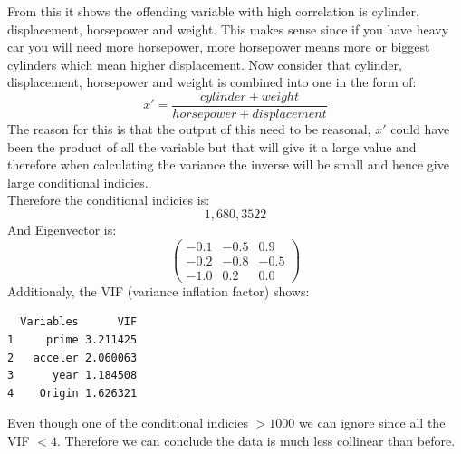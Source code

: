 \documentclass[11pt]{article} %
\begin{document}
From this it shows the offending variable with high correlation is cylinder, displacement, horsepower and weight. This makes sense since if you have heavy car you will need more horsepower, more horsepower means more or biggest cylinders which mean higher displacement. Now consider that cylinder, displacement, horsepower and weight is combined into one in the form of:
$$
x'=\frac{cylinder+weight}{horsepower+displacement}
$$
The reason for this is that the output of this need to be reasonal, $x'$ could have been the product of all the variable but that will give it a large value and therefore when calculating the variance the inverse will be small and hence give large conditional indicies.\\
Therefore the conditional indicies is:
$$
1 ,680,3522
$$
And Eigenvector is:
$$
\begin{pmatrix}
-0.1&-0.5&0.9\\
-0.2&-0.8&-0.5\\
-1.0&0.2&0.0
\end{pmatrix}
$$
Additionaly, the VIF (variance inflation factor) shows:
\begin{lstlisting}
  Variables      VIF
1     prime 3.211425
2   acceler 2.060063
3      year 1.184508
4    Origin 1.626321
\end{lstlisting}
Even though one of the conditional indicies $>1000$ we can ignore since all the VIF $<4$. Therefore we can conclude the data is much less collinear than before.
\end{document}
